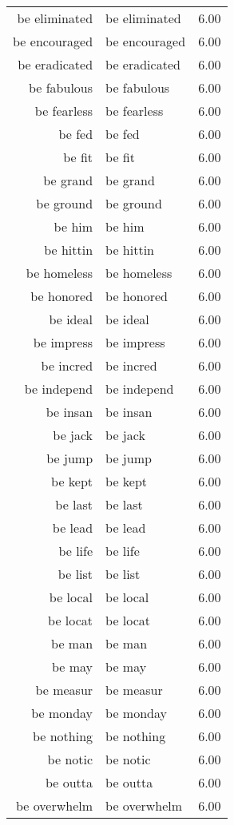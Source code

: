 \begin{table}[ht]
\begin{tabular}{rlr}
  be eliminated & be eliminated & 6.00 \\ 
  be encouraged & be encouraged & 6.00 \\ 
  be eradicated & be eradicated & 6.00 \\ 
  be fabulous & be fabulous & 6.00 \\ 
  be fearless & be fearless & 6.00 \\ 
  be fed & be fed & 6.00 \\ 
  be fit & be fit & 6.00 \\ 
  be grand & be grand & 6.00 \\ 
  be ground & be ground & 6.00 \\ 
  be him & be him & 6.00 \\ 
  be hittin & be hittin & 6.00 \\ 
  be homeless & be homeless & 6.00 \\ 
  be honored & be honored & 6.00 \\ 
  be ideal & be ideal & 6.00 \\ 
  be impress & be impress & 6.00 \\ 
  be incred & be incred & 6.00 \\ 
  be independ & be independ & 6.00 \\ 
  be insan & be insan & 6.00 \\ 
  be jack & be jack & 6.00 \\ 
  be jump & be jump & 6.00 \\ 
  be kept & be kept & 6.00 \\ 
  be last & be last & 6.00 \\ 
  be lead & be lead & 6.00 \\ 
  be life & be life & 6.00 \\ 
  be list & be list & 6.00 \\ 
  be local & be local & 6.00 \\ 
  be locat & be locat & 6.00 \\ 
  be man & be man & 6.00 \\ 
  be may & be may & 6.00 \\ 
  be measur & be measur & 6.00 \\ 
  be monday & be monday & 6.00 \\ 
  be nothing & be nothing & 6.00 \\ 
  be notic & be notic & 6.00 \\ 
  be outta & be outta & 6.00 \\ 
  be overwhelm & be overwhelm & 6.00 \\ 

\end{tabular}
\end{table}
